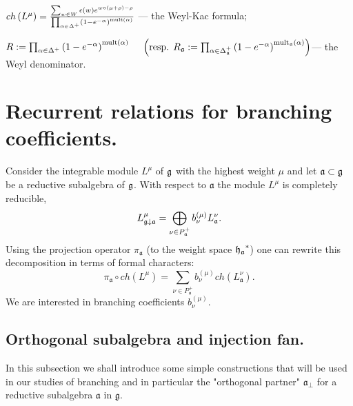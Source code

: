 \documentclass[12pt]{iopart}
\theoremstyle{definition}
\newcommand{\gf}{\mathfrak{g}}
\newcommand{\af}{\mathfrak{a}}
\newcommand{\afb}{\mathfrak{a}_{\bot}}
\begin{document}
$ch\left( L^{\mu }\right) =\frac{\sum_{w\in W}\epsilon (w)e^{w\circ (\mu
+\rho )-\rho }}{\prod_{\alpha \in \Delta ^{+}}\left( 1-e^{-\alpha }\right) ^{%
\mathrm{{mult}\left( \alpha \right) }}}$ --- the Weyl-Kac formula;

$R:=\prod_{\alpha \in \Delta ^{+}}\left( 1-e^{-\alpha }\right) ^{\mathrm{{%
mult}\left( \alpha \right) }}\quad $
$\left( \mbox{resp. }R_{\af}:=\prod_{\alpha \in \Delta _{%
\af}^{+}}\left( 1-e^{-\alpha }\right) ^{\mathrm{mult}_{\af}\mathrm{%
\left( \alpha \right) }}\right) $--- the Weyl denominator.



\section{Recurrent relations for branching coefficients.}
\label{sec:recurr-form-branch}

Consider the integrable module $L^{\mu }$
of $\frak{g}$ with the highest weight $\mu $ and
let $\af\subset \frak{g}$ be a reductive subalgebra of $\frak{g}$.
With respect to $\af$ the module $L^{\mu }$ is completely reducible,
\begin{equation*}
 L_{\frak{g}\downarrow \af}^{\mu }=\bigoplus
\limits_{\nu \in P_{\af}^{+}}b_{\nu }^{\left( \mu \right) }L_{\af}^{\nu }.
\end{equation*}
Using the projection operator $\pi_{\af}$ (to the weight space $\frak{h_a}^*$)
one can  rewrite this decomposition in terms of formal characters:
\begin{equation}
\label{branching1}
 \pi _{\af}\circ ch\left( L^{\mu }\right)
 =\sum_{\nu \in P_{\af}^{+}}b_{\nu }^{(\mu)}ch\left( L_{\af}^{\nu }\right) .
\end{equation}
We are interested in branching coefficients $b^{(\mu)}_{\nu}$.

\subsection{Orthogonal subalgebra and injection fan.}
\label{subsec:branching-orthog-pair}

In this subsection we shall introduce some simple constructions that will be used
in our studies of branching and in particular the "orthogonal partner" $\afb$ for a
reductive subalgebra $\af$  in  $\gf$.
\end{document}
